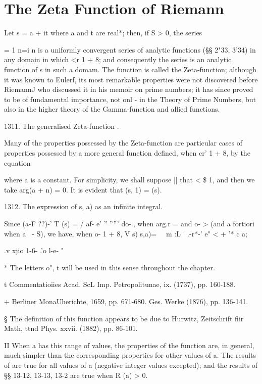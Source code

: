 \chapter{The Zeta Function of Riemann}


Let s = a + it where a and t are real*; then, if S > 0, the series

= 1 n=i n is a uniformly convergent series of analytic functions (§§
2"33, 3'34) in any domain in which <r 1 + 8; and consequently the
series is an analytic function of s in such a domam. The function is
called the Zeta-function; although it was known to Eulerf, its most
remarkable properties were not discovered before RiemannJ who
discussed it in his memoir on prime numbers; it has since proved to
be of fundamental importance, not onl - in the Theory of Prime
Numbers, but also in the higher theory of the Gamma-function and
allied functions.

1311. The generalised Zeta-function .

Many of the properties possessed by the Zeta-function are particular
cases of properties possessed by a more general function defined, when
cr' 1 + 8, by the equation

where a is a constant. For simplicity, we shall suppose || that < \$
1, and then we take arg(a + n) = 0. It is evident that (s, 1) = (s).

1312. The expression of s, a) as an infinite integral.

Since (a-F ??)-' T (s) = / af- e' '' ''''' do-., when arg.r = and o- >
(and a fortiori when a \ - S), we have, when o- 1 + 8, V s) s,a)= \ \
m :L | .-r*-' e" < + '* c a;

.v xjio 1-6- .'o l-e- "

* The letters o", t will be used in this sense throughout the chapter.

t Commentatioiies Acad. ScL Imp. Petropolitunae, ix. (1737), pp.
160-188.

+ Berliner MonaUherichte, 1659, pp. 671-680. Ges. Werke (1876), pp.
136-141.

§ The definition of this function appears to be due to Hurwitz,
Zeitschrift fiir Math, ttnd Phys. xxvii. (1882), pp. 86-101.

II When a has this range of values, the properties of the function
are, in general, much simpler than the corresponding properties for
other values of a. The results of\hardsubsectionref{13}{1}{4} are true for all values of a
(negative integer values excepted); and the results of §§ 13-12,
13-13, 13-2 are true when R (a) > 0.

